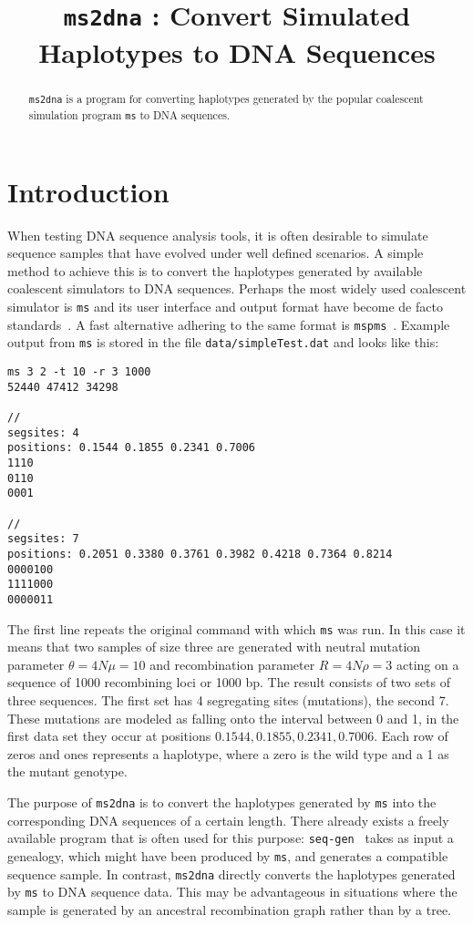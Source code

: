 \documentclass[a4paper, english]{article}
\begin{document}
\title{\texttt{ms2dna} : Convert Simulated Haplotypes to DNA Sequences}
\author{}

\date{}
\maketitle
\begin{abstract}
\texttt{ms2dna} is a program for converting haplotypes generated by the
popular coalescent simulation program \texttt{ms} to DNA sequences.
\end{abstract}

\section*{Introduction}
When testing DNA sequence analysis tools, it is often desirable to
simulate sequence samples that have evolved under well defined
scenarios. A simple method to achieve this is to convert the
haplotypes generated by available coalescent simulators to DNA
sequences. Perhaps the most widely used coalescent simulator is
\texttt{ms} and its user interface and output format have become de facto
standards~\cite{hud02:gen}. A fast alternative adhering to the same
format is \texttt{mspms}~\cite{kel16:eff}. Example output from \texttt{ms} is stored
in the file \texttt{data/simpleTest.dat} and looks like this:
\begin{verbatim}
ms 3 2 -t 10 -r 3 1000
52440 47412 34298

//
segsites: 4
positions: 0.1544 0.1855 0.2341 0.7006
1110
0110
0001

//
segsites: 7
positions: 0.2051 0.3380 0.3761 0.3982 0.4218 0.7364 0.8214
0000100
1111000
0000011
\end{verbatim}
The first line repeats the original command with which \texttt{ms} was
run. In this case it means that two samples of size three are
generated with neutral mutation parameter $\theta=4N\mu=10$ and
recombination parameter $R=4N\rho=3$ acting on a sequence of 1000
recombining loci or 1000 bp. The result consists of two sets of three
sequences. The first set has 4 segregating sites (mutations), the
second 7. These mutations are modeled as falling onto the interval
between 0 and 1, in the first data set they occur at positions
$0.1544, 0.1855, 0.2341, 0.7006$. Each row of zeros and ones
represents a haplotype, where a zero is the wild type and a 1 as the
mutant genotype.

The purpose of \texttt{ms2dna} is to convert the haplotypes generated by
\texttt{ms} into the corresponding DNA sequences of a certain length.
There already exists a freely available program that is often used for
this purpose: \texttt{seq-gen}~\cite{ram97:seq} takes as input a
genealogy, which might have been produced by \texttt{ms}, and generates a
compatible sequence sample. In contrast, \texttt{ms2dna} directly converts
the haplotypes generated by \texttt{ms} to DNA sequence data. This may be
advantageous in situations where the sample is generated by an
ancestral recombination graph rather than by a tree.
\end{document}
